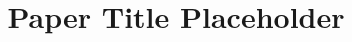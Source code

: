 \documentclass[10pt, conference, compsocconf]{styles/IEEEtran}
\title{Paper Title Placeholder}
\author{
\IEEEauthorblockN{Author1}
\IEEEauthorblockA{Institution1\\
Email1}
\and
\IEEEauthorblockN{Author2}
\IEEEauthorblockA{Institution1\\
Email2}
}
\newcommand{\point}[1]{\noindent\textbf{#1}.}
\begin{document}
\maketitle









 
\newcommand{\BIBdecl}{\setlength{\itemsep}{0\baselineskip plus 0.1\baselineskip minus 0.1\baselineskip}}
\balance
{\footnotesize 


}

\nocite{*}
 
%
\end{document}
